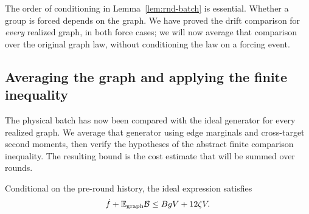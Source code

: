 The order of conditioning in Lemma~\ref{lem:rnd-batch} is essential.
Whether a group is forced depends on the graph.  We have proved the
drift comparison for \emph{every} realized graph, in both force cases;
we will now average that comparison over the original graph law,
without conditioning the law on a forcing event.

\subsection{Averaging the graph and applying the finite inequality}

The physical batch has now been compared with the ideal generator for
every realized graph. We average that generator using edge marginals and
cross-target second moments, then verify the hypotheses of the abstract
finite comparison inequality. The resulting bound is the cost estimate
that will be summed over rounds.

\begin{lemma}\label{lem:rnd-average}
Conditional on the pre-round history, the ideal expression satisfies
\begin{equation}\label{eq:rnd-average-drift}
 \dot f+\mathbb E_{\mathrm{graph}}\mathcal B
 \le BgV+12\zeta V.
\end{equation}
\end{lemma}

